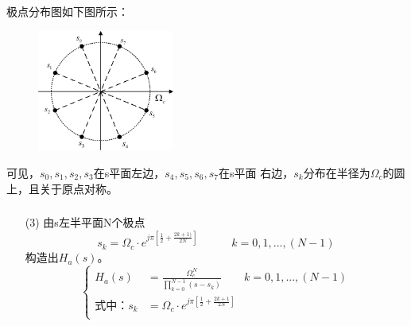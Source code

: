 \documentclass[notheorems,compress,mathserif,table]{beamer}
\begin{document}
\begin{frame}\frametitle{}%
      极点分布图如下图所示：
      \begin{figure}[h]
          \centering
          \includegraphics[width=0.4\textwidth]{fig8_example.jpg}
      \end{figure}

      可见，$s_{0},s_{1},s_{2},s_{3}$在s平面左边，$s_{4},s_{5},s_{6},s_{7}$在s平面
      右边，$s_{k}$分布在半径为$\Omega_{c}$的圆上，且关于原点对称。
\end{frame}


\begin{frame}\frametitle{}%
\begin{enumerate}
\item [(3)]
      由s左半平面N个极点
      $$s_{k}=\Omega_{c}\cdot e^{j\pi[\frac{1}{2}+\frac{2k+1)}{2N}]}\quad\quad\quad k=0,1,...,(N-1)$$
      构造出$H_{a}(s)$。
      $$
        \left\{ \begin{aligned}
            H_{a}(s) &= \frac{\Omega_{c}^{N}}{\prod^{N-1}_{k=0}(s-s_{k})}\quad\quad k=0,1,...,(N-1)\\
          \mbox{式中：}  s_{k}    &= \Omega_{c}\cdot e^{j\pi[\frac{1}{2}+\frac{2k+1}{2N}]}\\
        \end{aligned} \right.
      $$
\end{enumerate}
\end{frame}
\end{document}

